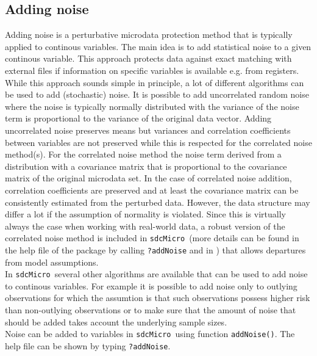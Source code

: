 \documentclass[12pt]{article}
\newcommand{\sdcMicro}{\texttt{sdcMicro}}
\begin{document}
\subsection{Adding noise}\label{method:noise}
Adding noise is a perturbative microdata protection method that is 
typically applied to continous variables. 
The main idea is to add statistical noise to a given continous 
variable. This approach protects data against exact matching 
with external files if information on specific variables is 
available e.g. from registers.\\

While this approach sounds simple in principle, a lot of different algorithms can be used to 
add (stochastic) noise. It is possible to add uncorrelated random noise where the noise 
is typically normally distributed with the variance of the noise term is proportional to the variance 
of the original data vector. Adding uncorrelated noise preserves means but variances 
and correlation coefficients between variables are not preserved while this is respected for the correlated noise method(s). 
For the correlated noise method \citep{Brand04} 
the noise term derived from a distribution with a covariance matrix that is proportional 
to the covariance matrix of the original microdata set. 
In the case of correlated noise addition, correlation coefficients are preserved 
and at least the covariance matrix can be consistently estimated from the perturbed data. However, the data structure may differ 
a lot if the assumption of normality is violated. Since this is virtually always the case when working with real-world data,
a robust version of the correlated noise method is included in \sdcMicro \ (more details can be found in the help file
of the package by calling \texttt{?addNoise} and in \cite{Templ08f}) that allows departures from model assumptions.\\

In \sdcMicro~several other algorithms are available that can be used to add noise to continous variables. 
For example it is possible to add noise only to outlying observations for which the assumtion 
is that such observations possess higher risk than non-outlying observations or to 
make sure that the amount of noise that should be added takes account 
the underlying sample sizes. \\

Noise can be added to variables in \sdcMicro~using function \lstinline{addNoise()}. 
The help file can be shown by typing \lstinline{?addNoise}.
\end{document}
